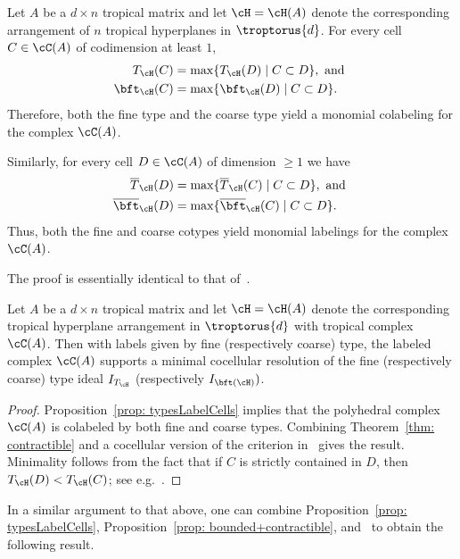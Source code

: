 \begin{prop}\label{prop: typesLabelCells} 
Let $A$ be a $d \times n$ tropical matrix and let $\cH = \cH(A)$ denote the corresponding arrangement of $n$ tropical hyperplanes in $\troptorus{d}$. For every cell $C\in \cC(A)$ of codimension at least $1$, 
\begin{align*}
    T_\cH(C) &= \max\{T_\cH(D)\mid C\subset D\}, \text{ and }\\
    \bft_\cH(C) &= \max\{\bft_\cH(D)\mid C\subset D\}.
\end{align*}
Therefore, both the fine type and the coarse type yield a monomial colabeling for the complex $\cC(A)$.

Similarly, for every cell $D\in \cC(A)$ of dimension $\geq 1$ we have
\begin{align*}
    \overline{T}_\cH(D) &= \max\{\overline{T}_\cH(C)\mid C\subset D\}, \text{ and }\\
    \overline{\bft}_\cH(D) &= \max\{\overline{\bft}_\cH(C)\mid C\subset D\}.
\end{align*}
Thus, both the fine and coarse cotypes yield monomial labelings for the complex $\cC(A)$.
\end{prop}

The proof is essentially identical to that of~\cite[Propositions 3.4 and 3.8]{dochtermann2012tropical}.

\begin{prop}\label{prop: cocellularRes} Let $A$ be a $d \times n$ tropical matrix and let $\cH = \cH(A)$ denote the corresponding tropical hyperplane arrangement in $\troptorus{d}$ with tropical complex $\cC(A)$. Then with labels given by fine (respectively coarse) type, the labeled complex $\cC(A)$ supports a minimal cocellular resolution of the fine (respectively coarse) type ideal $I_{T_\cH}$ (respectively $I_{\bft(\cH)})$.
\end{prop}

\begin{proof}
Proposition~\ref{prop: typesLabelCells} implies that the polyhedral complex $\cC(A)$ is colabeled by both fine and coarse types. Combining Theorem~\ref{thm: contractible} and a cocellular version of the criterion in~\cite[Prop. 4.5]{MillerSturmfels:2005} gives the result. Minimality follows from the fact that if $C$ is strictly contained in $D$, then $T_\cH(D) < T_\cH(C)$; see e.g.~\cite[Corollary 13]{develin2004tropical}.
\end{proof}

In a similar argument to that above, one can combine Proposition~\ref{prop: typesLabelCells}, Proposition~\ref{prop: bounded+contractible}, and~\cite[Prop. 4.5]{MillerSturmfels:2005} to obtain the following result.

